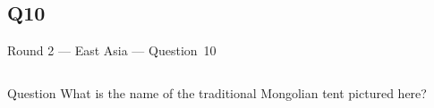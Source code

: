 \documentclass[11pt]{beamer}
\begin{document}
\subsection*{Q10}
\begin{frame}[t]{Round 2 --- East Asia --- \mbox{Question 10}}
\vspace{-0.5em}
\begin{columns}[T,totalwidth=\linewidth]
\begin{column}{0.32\linewidth}
\begin{block}{Question}
What is the name of the traditional Mongolian tent pictured here?
\end{block}
\end{column}
\begin{column}{0.65\linewidth}
\begin{center}
\texttt{[image: \{Images/yurt]}.png}
\end{center}
\end{column}
\end{columns}
\end{frame}
\end{document}
